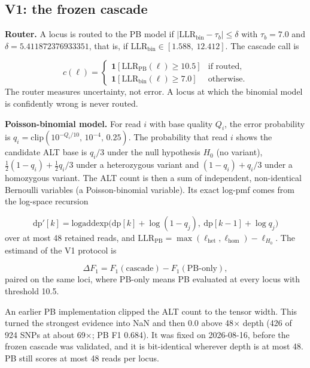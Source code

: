 \documentclass[11pt,a4paper]{article}
\makeatletter
\newcommand{\needspace}[1]{\par\ifdim\pagegoal=\maxdimen\else\dimen@=\pagegoal\advance\dimen@-\pagetotal\ifdim\dimen@<#1\relax\newpage\fi\fi}
\makeatother
\begin{document}
\needspace{6\baselineskip}
\subsection{\texorpdfstring{V1: the frozen cascade}{V1: the frozen cascade}}
\textbf{Router.} A locus is routed to the PB model if $|\mathrm{LLR}_{\mathrm{bin}} - \tau_b| \le \delta$ with $\tau_b = 7.0$ and $\delta = 5.411872376933351$, that is, if $\mathrm{LLR}_{\mathrm{bin}} \in [1.588,\ 12.412]$. The cascade call is

\[
c(\ell)=\begin{cases}
\mathbf 1[\mathrm{LLR}_{\mathrm{PB}}(\ell)\ge 10.5] & \text{if routed},\\
\mathbf 1[\mathrm{LLR}_{\mathrm{bin}}(\ell)\ge 7.0] & \text{otherwise.}
\end{cases}
\]
The router measures uncertainty, not error. A locus at which the binomial model is confidently wrong is never routed.

\textbf{Poisson-binomial model.} For read $i$ with base quality $Q_i$, the error probability is $q_i = \mathrm{clip}(10^{-Q_i/10},\,10^{-4},\,0.25)$. The probability that read $i$ shows the candidate ALT base is $q_i/3$ under the null hypothesis $H_0$ (no variant), $\tfrac12(1-q_i)+\tfrac12 q_i/3$ under a heterozygous variant and $(1-q_i)+q_i/3$ under a homozygous variant. The ALT count is then a sum of independent, non-identical Bernoulli variables (a Poisson-binomial variable). Its exact log-pmf comes from the log-space recursion

\[
\mathrm{dp}'[k]=\mathrm{logaddexp}\big(\mathrm{dp}[k]+\log(1-q_j),\ \mathrm{dp}[k-1]+\log q_j\big)
\]
over at most 48 retained reads, and $\mathrm{LLR}_{\mathrm{PB}} = \max(\ell_{\mathrm{het}},\ell_{\mathrm{hom}}) - \ell_{H_0}$. The estimand of the V1 protocol is

\[
\Delta F_1 = F_1(\text{cascade}) - F_1(\text{PB-only}),
\]
paired on the same loci, where PB-only means PB evaluated at every locus with threshold 10.5.

An earlier PB implementation clipped the ALT count to the tensor width. This turned the strongest evidence into NaN and then 0.0 above 48$\times$ depth (426 of 924 SNPs at about 69$\times$; PB F1 0.684). It was fixed on 2026-08-16, before the frozen cascade was validated, and it is bit-identical wherever depth is at most 48. PB still scores at most 48 reads per locus.
\end{document}
